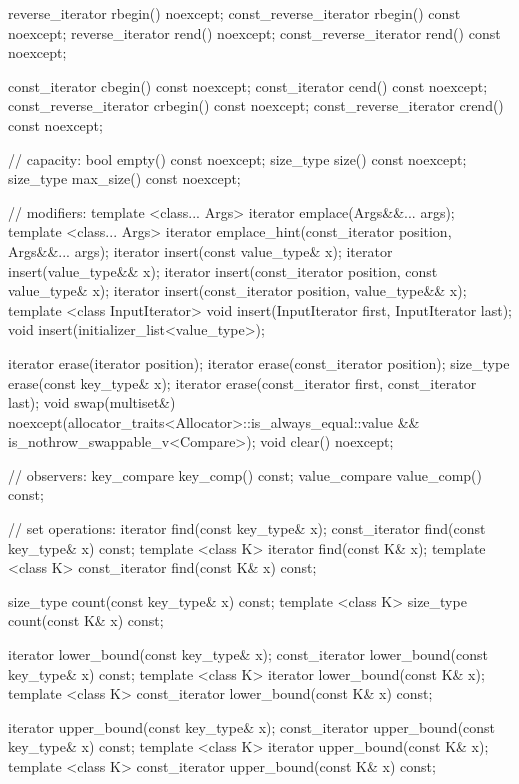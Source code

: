 \begin{codeblock}
{{    reverse_iterator       rbegin() noexcept;
    const_reverse_iterator rbegin() const noexcept;
    reverse_iterator       rend() noexcept;
    const_reverse_iterator rend() const noexcept;

    const_iterator         cbegin() const noexcept;
    const_iterator         cend() const noexcept;
    const_reverse_iterator crbegin() const noexcept;
    const_reverse_iterator crend() const noexcept;

    // capacity:
    bool      empty() const noexcept;
    size_type size() const noexcept;
    size_type max_size() const noexcept;

    // modifiers:
    template <class... Args> iterator emplace(Args&&... args);
    template <class... Args> iterator emplace_hint(const_iterator position, Args&&... args);
    iterator insert(const value_type& x);
    iterator insert(value_type&& x);
    iterator insert(const_iterator position, const value_type& x);
    iterator insert(const_iterator position, value_type&& x);
    template <class InputIterator>
      void insert(InputIterator first, InputIterator last);
    void insert(initializer_list<value_type>);

    iterator  erase(iterator position);
    iterator  erase(const_iterator position);
    size_type erase(const key_type& x);
    iterator  erase(const_iterator first, const_iterator last);
    void      swap(multiset&)
      noexcept(allocator_traits<Allocator>::is_always_equal::value &&
               is_nothrow_swappable_v<Compare>);
    void      clear() noexcept;

    // observers:
    key_compare key_comp() const;
    value_compare value_comp() const;

    // set operations:
    iterator       find(const key_type& x);
    const_iterator find(const key_type& x) const;
    template <class K> iterator       find(const K& x);
    template <class K> const_iterator find(const K& x) const;

    size_type      count(const key_type& x) const;
    template <class K> size_type count(const K& x) const;

    iterator       lower_bound(const key_type& x);
    const_iterator lower_bound(const key_type& x) const;
    template <class K> iterator       lower_bound(const K& x);
    template <class K> const_iterator lower_bound(const K& x) const;

    iterator       upper_bound(const key_type& x);
    const_iterator upper_bound(const key_type& x) const;
    template <class K> iterator       upper_bound(const K& x);
    template <class K> const_iterator upper_bound(const K& x) const;

}}
\end{codeblock}
